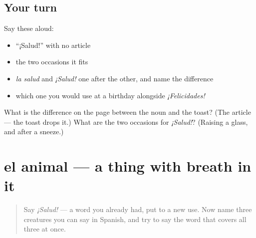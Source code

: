\subsection*{Your turn}
Say these aloud:

\begin{itemize}
\raggedright
  \item \textquotedblleft{}¡Salud!\textquotedblright{} with no article
  \item the two occasions it fits
  \item \emph{la salud} and \emph{¡Salud!} one after the other, and name the difference
  \item which one you would use at a birthday alongside \emph{¡Felicidades!}
\end{itemize}

\begin{tcolorbox}[breakable,colback=teal!4,colframe=teal!35!black,title={Before you move on}]
What is the difference on the page between the noun and the toast? (The article — the toast drops it.) What are the two occasions for \emph{¡Salud!}? (Raising a glass, and after a sneeze.)
\end{tcolorbox}
\section[el animal]{el animal — a thing with breath in it}

\label{lesson:ES-C428-animal}



\begin{quote}
Say \emph{¡Salud!} — a word you already had, put to a new use. Now name three creatures you can say in Spanish, and try to say the word that covers all three at once.
\end{quote}

